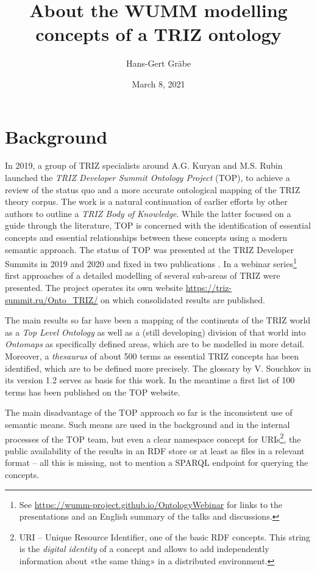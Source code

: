 \documentclass[11pt,a4paper]{article}
\title{About the WUMM modelling concepts of a TRIZ ontology}
\author{Hans-Gert Gr\"abe}
\date{March 8,  2021}
\begin{document}
\maketitle

\section{Background}

In 2019, a group of TRIZ specialists around A.G. Kuryan and M.S. Rubin
launched the \emph{TRIZ Developer Summit Ontology Project} (TOP), to achieve a
review of the status quo and a more accurate ontological mapping of the TRIZ
theory corpus. The work is a natural continuation of earlier efforts by other
authors \cite{TBK2007, TBK2012} to outline a \emph{TRIZ Body of Knowledge}.
While the latter focused on a guide through the literature, TOP is concerned
with the identification of essential concepts and essential relationships
between these concepts using a modern semantic approach. The status of TOP was
presented at the TRIZ Developer Summits in 2019 and 2020 and fixed in two
publications \cite{TOP2019, TOP2020}. In a webinar series\footnote{See
  \url{https://wumm-project.github.io/OntologyWebinar} for links to the
  presentations and an English summary of the talks and discussions.}  first
approaches of a detailed modelling of several sub-areas of TRIZ were
presented.  The project operates its own website
\url{https://triz-summit.ru/Onto_TRIZ/} on which consolidated results are
published.

The main results so far have been a mapping of the continents of the TRIZ
world as a \emph{Top Level Ontology} as well as a (still developing) division
of that world into \emph{Ontomaps} as specifically defined areas, which are to
be modelled in more detail. Moreover, a \emph{thesaurus} of about 500 terms as
essential TRIZ concepts has been identified, which are to be defined more
precisely. The glossary \cite{Souchkov2018} by V. Souchkov in its version 1.2
serves as basis for this work. In the meantime a first list of 100 terms
\cite{TOP-Glossary} has been published on the TOP website.

The main disadvantage of the TOP approach so far is the inconsistent use of
semantic means. Such means are used in the background and in the internal
processes of the TOP team, but even a clear namespace concept for
URIs\footnote{URI -- Unique Resource Identifier, one of the basic RDF
  concepts. This string is the \emph{digital identity} of a concept and allows
  to add independently information about «the same thing» in a distributed
  environment. }, the public availability of the results in an RDF store or at
least as files in a relevant format -- all this is missing, not to mention a
SPARQL endpoint for querying the concepts.
\end{document}
